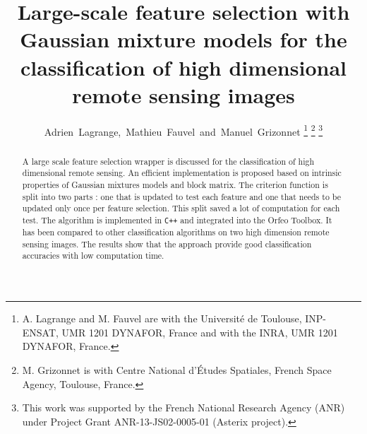 \documentclass[journal,10pt]{IEEEtran}
\begin{document}
%
\title{Large-scale feature selection with Gaussian mixture models for the classification of high dimensional remote sensing images}
%
%
%

\author{Adrien~Lagrange,~Mathieu~Fauvel~and~Manuel~Grizonnet%
\thanks{A. Lagrange and M. Fauvel are with the Universit\'{e} de Toulouse,
INP-ENSAT, UMR 1201 DYNAFOR, France and with the INRA, UMR 1201
DYNAFOR, France.}%
\thanks{M. Grizonnet is with Centre National d'\'{E}tudes Spatiales, French Space Agency, Toulouse, France.}%
\thanks{This  work was  supported  by the  French National  Research Agency  (ANR)  under  Project Grant  ANR-13-JS02-0005-01  (Asterix project).}}


\maketitle

\begin{abstract}
  A  large  scale  feature  selection wrapper  is  discussed  for  the
  classification  of high  dimensional  remote  sensing. An  efficient
  implementation is proposed based on intrinsic properties of Gaussian
  mixtures models and  block matrix.  The criterion  function is split
  into two parts  : one that is  updated to test each  feature and one
  that needs to be updated only once per feature selection. This split
  saved  a  lot  of  computation  for each  test.   The  algorithm  is
  implemented in  \texttt{C++} and integrated into  the Orfeo Toolbox.
  It has been compared to  other classification algorithms on two high
  dimension remote sensing images. The  results show that the approach
  provide good classification accuracies with low computation time.
\end{abstract}
\end{document}

